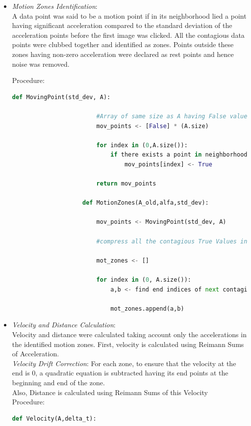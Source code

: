 \documentclass{article}
\begin{document}
\begin{itemize}
\begin{lstlisting}[language=Python, caption=LocalRegression()]
							denom <- sum_weights*sum_pos2weights - sum_posdataweights^2
							numer <- sum_pos2weights*sum_dataweights + index*sum_weights*sum_posdataweights - sum_posweights*sum_posdataweights - index*sum_dataweights*sum_posweights

							A_old[index] <- numer/denom 


				\end{lstlisting}

				\item \textit{Motion Zones Identification}:\\ A data point was said to be a motion point if in its neighborhood lied a point having significant acceleration compared to the standard deviation of the acceleration points before the first image was clicked. All the contagious data points were clubbed together and identified as zones. Points outside these zones having non-zero acceleration were declared as rest points and hence noise was removed.

				 Procedure:
				\begin{lstlisting}[language=Python, caption=MotionZones()]
					def MovingPoint(std_dev, A):

						#Array of same size as A having False values
						mov_points <- [False] * (A.size)

						for index in (0,A.size()):
							if there exists a point in neighborhood of length 50 of index having A[nbh] > std_dev:
								mov_points[index] <- True

						return mov_points 

					def MotionZones(A_old,alfa,std_dev):

						mov_points <- MovingPoint(std_dev, A)

						#compress all the contagious True Values in mov_points. Starting with empty array

						mot_zones <- []

						for index in (0, A.size()):
							a,b <- find end indices of next contagious region of True values in mov_points

							mot_zones.append(a,b)
				\end{lstlisting}


				\item \textit{Velocity and Distance Calculation}:\\ Velocity and distance were calculated taking account only the accelerations in the identified motion zones. First, velocity is calculated using Reimann Sums of Acceleration. 
				\\ \textit{Velocity Drift Correction}: For each zone, to ensure that the velocity at the end is 0, a quadratic equation is subtracted having its end points at the beginning and end of the zone. \\Also, Distance is calculated using Reimann Sums of this Velocity
				\\ Procedure:
				\begin{lstlisting}[language=Python, caption=Velocity()]
					def Velocity(A,delta_t):


\end{lstlisting}
\end{itemize}
\end{document}
